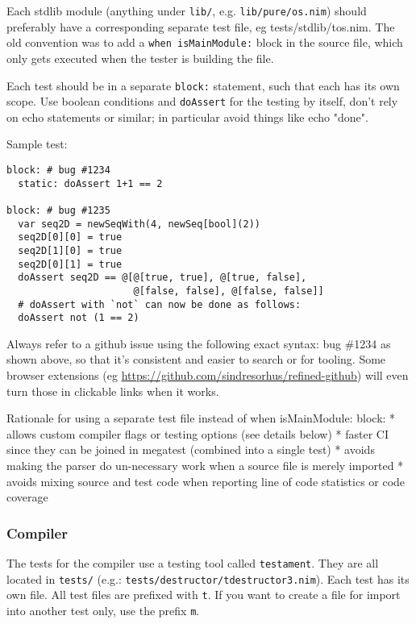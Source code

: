 Each stdlib module (anything under \texttt{lib/}, e.g.
\texttt{lib/pure/os.nim}) should preferably have a corresponding
separate test file, eg {tests/stdlib/tos.nim}. The old convention was to
add a \texttt{when\ isMainModule:} block in the source file, which only
gets executed when the tester is building the file.

Each test should be in a separate \texttt{block:} statement, such that
each has its own scope. Use boolean conditions and \texttt{doAssert} for
the testing by itself, don't rely on echo statements or similar; in
particular avoid things like {echo "done"}.

Sample test:

\begin{verbatim}
block: # bug #1234
  static: doAssert 1+1 == 2

block: # bug #1235
  var seq2D = newSeqWith(4, newSeq[bool](2))
  seq2D[0][0] = true
  seq2D[1][0] = true
  seq2D[0][1] = true
  doAssert seq2D == @[@[true, true], @[true, false],
                      @[false, false], @[false, false]]
  # doAssert with `not` can now be done as follows:
  doAssert not (1 == 2)
\end{verbatim}

Always refer to a github issue using the following exact syntax: {bug
\#1234} as shown above, so that it's consistent and easier to search or
for tooling. Some browser extensions (eg
\url{https://github.com/sindresorhus/refined-github}) will even turn
those in clickable links when it works.

Rationale for using a separate test file instead of {when isMainModule:}
block: * allows custom compiler flags or testing options (see details
below) * faster CI since they can be joined in {megatest} (combined into
a single test) * avoids making the parser do un-necessary work when a
source file is merely imported * avoids mixing source and test code when
reporting line of code statistics or code coverage

\hypertarget{compiler}{%
\subsubsection{Compiler}\label{compiler}}

The tests for the compiler use a testing tool called \texttt{testament}.
They are all located in \texttt{tests/} (e.g.:
\texttt{tests/destructor/tdestructor3.nim}). Each test has its own file.
All test files are prefixed with \texttt{t}. If you want to create a
file for import into another test only, use the prefix \texttt{m}.

